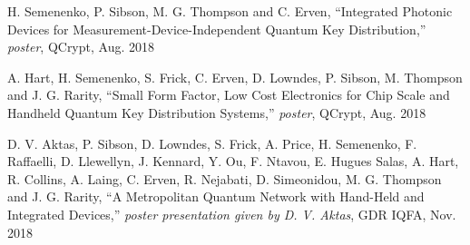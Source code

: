 {H. Semenenko, P. Sibson, M. G. Thompson and C. Erven, ``Integrated Photonic Devices for Measurement-Device-Independent Quantum Key Distribution,'' \textit{poster}, QCrypt, Aug. 2018

A. Hart, H. Semenenko, S. Frick, C. Erven, D. Lowndes, P. Sibson, M. Thompson and J. G. Rarity, ``Small Form Factor, Low Cost Electronics for Chip Scale and Handheld Quantum Key Distribution Systems,'' \textit{poster}, QCrypt, Aug. 2018

D. V. Aktas, P. Sibson, D. Lowndes, S. Frick, A. Price, H. Semenenko, F. Raffaelli, D. Llewellyn, J. Kennard, Y. Ou, F. Ntavou, E. Hugues Salas, A. Hart, R. Collins, A. Laing, C. Erven, R. Nejabati, D. Simeonidou, M. G. Thompson and J. G. Rarity, ``A Metropolitan Quantum Network with Hand-Held and Integrated Devices,'' \textit{poster presentation given by D. V. Aktas}, GDR IQFA, Nov. 2018
}
\clearpage